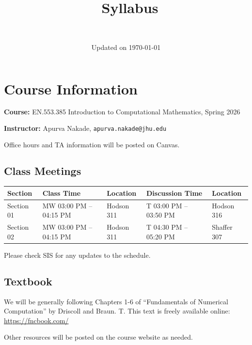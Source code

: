 \documentclass{article}
\title{\course \\ \semester\ Syllabus}
\author{\instructor \\ \texttt{\email}}
\date{Updated on \today}
\makeatletter
\newcommand{\course}{EN.553.385 Introduction to Computational Mathematics}
\newcommand{\semester}{Spring 2026}
\newcommand{\instructor}{Apurva Nakade}
\newcommand{\email}{apurva.nakade@jhu.edu}
\newcommand{\sectionbreak}{\newpage}
\makeatother
\begin{document}
\maketitle
\tableofcontents

\sectionbreak
\section{Course Information}

\textbf{Course:} \course, \semester

\textbf{Instructor:} \instructor, \texttt{\email}

Office hours and TA information will be posted on Canvas.

\subsection{Class Meetings}

\begin{center}
    \begin{tabular}{@{}lllll@{}}
        \toprule
        \textbf{Section} & \textbf{Class Time} & \textbf{Location} & \textbf{Discussion Time} & \textbf{Location} \\
        \midrule
        Section 01 & MW 03:00 PM -- 04:15 PM & Hodson 311 & T 03:00 PM -- 03:50 PM & Hodson 316 \\
        Section 02 & MW 03:00 PM -- 04:15 PM & Hodson 311 & T 04:30 PM -- 05:20 PM & Shaffer 307 \\
        \bottomrule
    \end{tabular}
\end{center}

Please check SIS for any updates to the schedule.


\subsection{Textbook}
We will be generally following Chapters 1-6 of ``Fundamentals of Numerical Computation'' by
Driscoll and Braun. T. This text is freely available online:
\url{https://fncbook.com/}

Other resources will be posted on the course website as needed.
\end{document}
